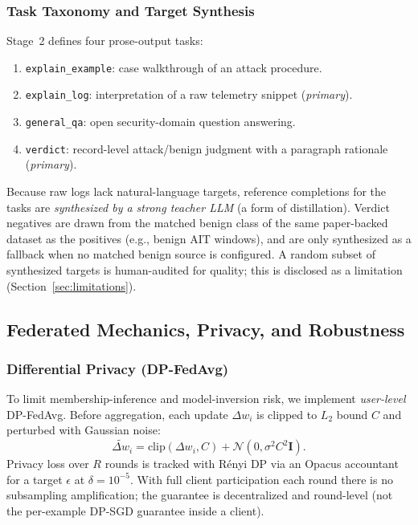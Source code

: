 \documentclass[11pt,a4paper]{article}
\begin{document}
\subsubsection{Task Taxonomy and Target Synthesis}
Stage~2 defines four prose-output tasks:
\begin{enumerate}
    \item \texttt{explain\_example}: case walkthrough of an attack procedure.
    \item \texttt{explain\_log}: interpretation of a raw telemetry snippet (\emph{primary}).
    \item \texttt{general\_qa}: open security-domain question answering.
    \item \texttt{verdict}: record-level attack/benign judgment with a paragraph rationale (\emph{primary}).
\end{enumerate}
Because raw logs lack natural-language targets, reference completions for the tasks are \emph{synthesized by a strong teacher LLM} (a form of distillation). Verdict negatives are drawn from the matched benign class of the same paper-backed dataset as the positives (e.g., benign AIT windows), and are only synthesized as a fallback when no matched benign source is configured. A random subset of synthesized targets is human-audited for quality; this is disclosed as a limitation (Section~\ref{sec:limitations}).

\subsection{Federated Mechanics, Privacy, and Robustness}
\subsubsection{Differential Privacy (DP-FedAvg)}
To limit membership-inference and model-inversion risk, we implement \emph{user-level} DP-FedAvg. Before aggregation, each update $\Delta w_i$ is clipped to $L_2$ bound $C$ and perturbed with Gaussian noise:
\begin{equation}
    \tilde{\Delta w}_i = \mathrm{clip}(\Delta w_i, C) + \mathcal{N}(0, \sigma^2 C^2 \mathbf{I}).
\end{equation}
Privacy loss over $R$ rounds is tracked with R\'enyi DP via an Opacus accountant for a target $\epsilon$ at $\delta{=}10^{-5}$. With full client participation each round there is no subsampling amplification; the guarantee is decentralized and round-level (not the per-example DP-SGD guarantee inside a client).
\end{document}
